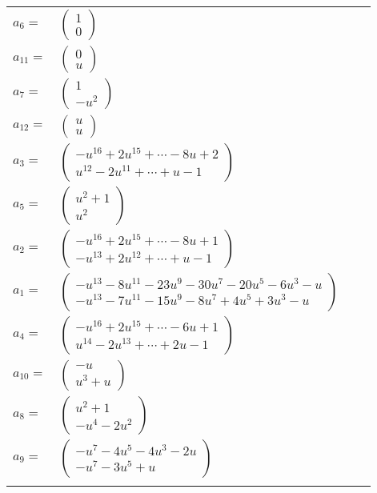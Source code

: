 \documentclass[1p]{elsarticle_modified}
\theoremstyle{definition}
\begin{document}
\begin{tabular}{m{7pt} m{180pt} m{7pt} m{180pt} }
\flushright $a_{6}=$&$\begin{pmatrix}1\\0\end{pmatrix}$ \\
\flushright $a_{11}=$&$\begin{pmatrix}0\\u\end{pmatrix}$ \\
\flushright $a_{7}=$&$\begin{pmatrix}1\\- u^2\end{pmatrix}$ \\
\flushright $a_{12}=$&$\begin{pmatrix}u\\u\end{pmatrix}$ \\
\flushright $a_{3}=$&$\begin{pmatrix}- u^{16}+2 u^{15}+\cdots-8 u+2\\u^{12}-2 u^{11}+\cdots+u-1\end{pmatrix}$ \\
\flushright $a_{5}=$&$\begin{pmatrix}u^2+1\\u^2\end{pmatrix}$ \\
\flushright $a_{2}=$&$\begin{pmatrix}- u^{16}+2 u^{15}+\cdots-8 u+1\\- u^{13}+2 u^{12}+\cdots+u-1\end{pmatrix}$ \\
\flushright $a_{1}=$&$\begin{pmatrix}- u^{13}-8 u^{11}-23 u^9-30 u^7-20 u^5-6 u^3- u\\- u^{13}-7 u^{11}-15 u^9-8 u^7+4 u^5+3 u^3- u\end{pmatrix}$ \\
\flushright $a_{4}=$&$\begin{pmatrix}- u^{16}+2 u^{15}+\cdots-6 u+1\\u^{14}-2 u^{13}+\cdots+2 u-1\end{pmatrix}$ \\
\flushright $a_{10}=$&$\begin{pmatrix}- u\\u^3+u\end{pmatrix}$ \\
\flushright $a_{8}=$&$\begin{pmatrix}u^2+1\\- u^4-2 u^2\end{pmatrix}$ \\
\flushright $a_{9}=$&$\begin{pmatrix}- u^7-4 u^5-4 u^3-2 u\\- u^7-3 u^5+u\end{pmatrix}$\\&\end{tabular}
\end{document}
